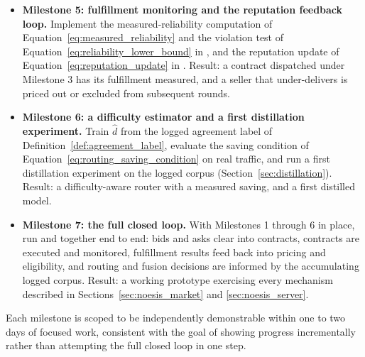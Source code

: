 \begin{itemize}
  \item \textbf{Milestone 5: fulfillment monitoring and the reputation
    feedback loop.} Implement the measured-reliability computation of
    Equation~\eqref{eq:measured_reliability} and the violation test of
    Equation~\eqref{eq:reliability_lower_bound} in \NoesisServer, and
    the reputation update of Equation~\eqref{eq:reputation_update} in
    \NoesisMarket. Result: a contract dispatched under Milestone 3 has
    its fulfillment measured, and a seller that under-delivers is priced
    out or excluded from subsequent rounds.

  \item \textbf{Milestone 6: a difficulty estimator and a first
    distillation experiment.} Train $\hat d$ from the logged agreement
    label of Definition~\ref{def:agreement_label}, evaluate the saving
    condition of Equation~\eqref{eq:routing_saving_condition} on real
    traffic, and run a first distillation experiment on the logged
    corpus (Section~\ref{sec:distillation}). Result: a difficulty-aware
    router with a measured saving, and a first distilled model.

  \item \textbf{Milestone 7: the full closed loop.} With Milestones 1
    through 6 in place, run \NoesisMarket{} and \NoesisServer{} together
    end to end: bids and asks clear into contracts, contracts are
    executed and monitored, fulfillment results feed back into pricing
    and eligibility, and routing and fusion decisions are informed by
    the accumulating logged corpus. Result: a working prototype
    exercising every mechanism described in
    Sections~\ref{sec:noesis_market} and \ref{sec:noesis_server}.
\end{itemize}

Each milestone is scoped to be independently demonstrable within one to
two days of focused work, consistent with the goal of showing progress
incrementally rather than attempting the full closed loop in one step.
